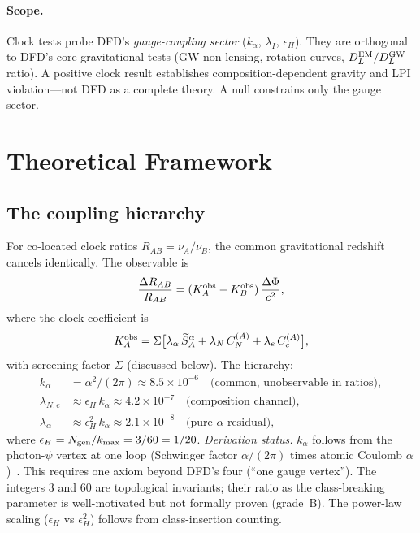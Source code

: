 \documentclass[aps,prd,twocolumn,superscriptaddress,floatfix]{revtex4-2}
\newcommand{\kalpha}{k_\alpha}
\newcommand{\epsH}{\epsilon_H}
\begin{document}
\paragraph{Scope.} Clock tests probe DFD's \textit{gauge-coupling
sector} ($\kalpha$, $\lambda_I$, $\epsH$). They are orthogonal
to DFD's core gravitational tests (GW non-lensing, rotation curves,
$D_L^{\rm EM}/D_L^{\rm GW}$ ratio). A positive clock result
establishes composition-dependent gravity and LPI violation---not
DFD as a complete theory. A null constrains only the gauge sector.
\section{Theoretical Framework}
\subsection{The coupling hierarchy}
For co-located clock ratios $R_{AB} = \nu_A/\nu_B$, the common
gravitational redshift cancels identically. The observable is
\begin{equation}\label{eq:ratio-obs}
\frac{\Delta R_{AB}}{R_{AB}}
= (K_A^{\rm obs} - K_B^{\rm obs})\,\frac{\Delta\Phi}{c^2},
\end{equation}
where the clock coefficient is
\begin{equation}\label{eq:Kobs}
K_A^{\rm obs} = \Sigma\bigl[\lambda_\alpha\,\widetilde{S}_A^\alpha
+ \lambda_N\,C_N^{(A)} + \lambda_e\,C_e^{(A)}\bigr],
\end{equation}
with screening factor $\Sigma$ (discussed below). The hierarchy:
\begin{align}
\kalpha &= \alpha^2/(2\pi) \approx 8.5 \times 10^{-6}
 \quad \text{(common, unobservable in ratios)}, \label{eq:kalpha}\\
\lambda_{N,e} &\approx \epsH\,\kalpha \approx 4.2 \times 10^{-7}
 \quad \text{(composition channel)}, \label{eq:lcomp}\\
\lambda_\alpha &\approx \epsH^2\,\kalpha \approx 2.1 \times 10^{-8}
 \quad \text{(pure-$\alpha$ residual)}, \label{eq:lalpha}
\end{align}
where $\epsH = N_{\rm gen}/k_{\max} = 3/60 = 1/20$.
\textit{Derivation status.}
$\kalpha$ follows from the photon-$\psi$ vertex at one loop
(Schwinger factor $\alpha/(2\pi)$ times atomic Coulomb
$\alpha$)~\cite{Alcock2026DFD}. This requires one axiom beyond
DFD's four (``one gauge vertex''). The integers 3 and 60 are
topological invariants; their ratio as the class-breaking parameter
is well-motivated but not formally proven (grade~B). The power-law
scaling ($\epsH$ vs $\epsH^2$) follows from class-insertion counting.
\end{document}
